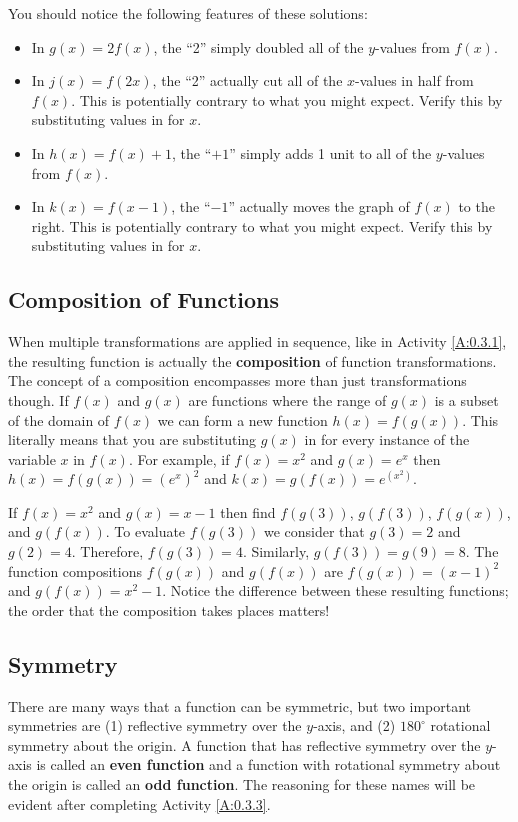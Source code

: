You should notice the following features of these solutions:
\begin{itemize}
    \item In $g(x)=2f(x)$, the ``2'' simply doubled all of the $y$-values from $f(x)$.  
    \item In $j(x)=f(2x)$, the ``2'' actually cut all of the $x$-values in half from $f(x)$.
        This is potentially contrary to what you might expect. Verify this by substituting
        values in for $x$.
    \item In $h(x)=f(x)+1$, the ``$+1$'' simply adds 1 unit to all of the $y$-values from
        $f(x)$.
    \item In $k(x)=f(x-1)$, the ``$-1$'' actually moves the graph of $f(x)$ to the right.
        This is potentially contrary to what you might expect. Verify this by substituting
        values in for $x$.
\end{itemize}
\afterex






\subsection*{Composition of Functions}
When multiple transformations are applied in sequence, like in Activity \ref{A:0.3.1}, the
resulting function is actually the {\bf composition} of function transformations.  The
concept of a composition encompasses more than just transformations though.  If $f(x)$ and
$g(x)$ are functions where the range of $g(x)$ is a subset of the domain of $f(x)$ we can
form a new function $h(x) = f(g(x))$. This literally means that you are substituting
$g(x)$ in for every instance of the variable $x$ in $f(x)$.  For example, if $f(x) = x^2$
and $g(x) = e^x$ then $h(x) = f(g(x)) = \left( e^x \right)^2$ and $k(x) = g(f(x)) =
e^{(x^2)}$.  

\bex
If $f(x) = x^2$ and $g(x) = x-1$ then find $f(g(3))$, $g(f(3))$, $f(g(x))$, and
$g(f(x))$.
\eex
To evaluate $f(g(3))$ we consider that $g(3) = 2$ and $g(2) = 4$.  Therefore, $f(g(3))=4$.
Similarly, $g(f(3)) = g(9) = 8$.  The function compositions $f(g(x))$ and $g(f(x))$ are
$f(g(x)) = (x-1)^2$ and $g(f(x))=x^2 - 1$.  Notice the difference between these resulting
functions; the order that the composition takes places matters!
\afterex



\subsection*{Symmetry}
There are many ways that a function can be symmetric, but two important symmetries are (1)
reflective symmetry over the $y$-axis, and (2) $180^\circ$ rotational symmetry about the
origin.  A function that has reflective symmetry over the $y$-axis is called an {\bf even
function} and a function with rotational symmetry about the origin is called an {\bf odd
function}.  The reasoning for these names will be evident after completing Activity
\ref{A:0.3.3}.

